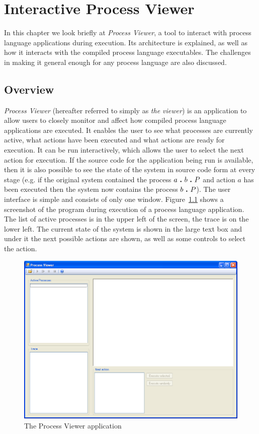 \chapter{Interactive Process Viewer}\label{ch:process_viewer}

	In this chapter we look briefly at \textit{Process Viewer}, a tool to interact
	with process language applications during execution. Its architecture is 
	explained, as well as how it interacts with the compiled process language 
	executables. The challenges in making it general enough for any process
	language are also discussed.

\section{Overview}

	\textit{Process Viewer} (hereafter referred to simply as \textit{the viewer})
	is an application to allow users to closely monitor
	and affect how compiled process language applications are executed. It enables
	the user to see what processes are currently active, what actions have been
	executed and what actions are ready for execution. It can be run 
	interactively, which allows the user to select the next action for execution.
	If the source code for the application being run is available, then it is also
	possible to see the state of the system in source code form at every stage 
	(e.g. if the original system contained the process $a \ \textbf{.}\  b \ \textbf{.}\  P$ and
	action $a$ has been executed then the system now contains the process 
	$b \ \textbf{.}\  P$). The user interface is simple and consists of only one window.
	Figure~\ref{fig:process_viewer} shows a screenshot of the program during 
	execution of a process language application. The list of active processes is 
	in the upper left of the screen, the trace is on the lower left. The current 
	state of the system is shown in the large text box and under it the next 
	possible actions are shown, as well as some controls to select the action.
	
	\begin{figure}[h!]
		\centering
		\includegraphics[scale=0.4]{process_viewer.png}
		\caption{The Process Viewer application}
		\label{fig:process_viewer}
	\end{figure}
	

